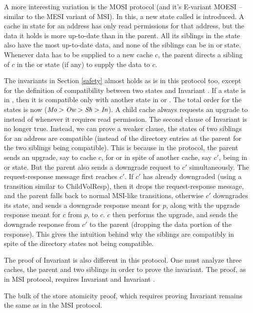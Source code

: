 A more interesting variation is the MOSI protocol (and it's E-variant MOESI --
similar to the MESI variant of MSI). In this, a new state called \Ow{} is
introduced. A cache in \Ow{} state for an address has only read permissions for
that address, but the data it holds is more up-to-date than in the parent.
All its siblings in the \Sh{} state also have the most up-to-date data, and
none of the siblings can be in \Mo{} or \Ow{} state.
Whenever data has to be supplied to a new cache $c$, the parent directs a
sibling of $c$ in the \Ow{} or \Mo{} state (if any) to supply the data to $c$.

The invariants in Section \ref{safety} almost holds as is in this protocol too,
except for the definition of compatibility between two states and Invariant
. If a state is in \Ow{}, then it is compatible only
with another state in \Sh{} or \In{}. The total order for the states is now
($\textit{Mo} > \textit{Ow} > \textit{Sh} > \textit{In}$). A child cache always requests an upgrade to \Ow{}
instead of \Sh{} whenever it requires read permission. The second clause of
Invariant  is no longer true. Instead, we can prove
a weaker clause, \viz the states of two siblings for an address are compatible
(instead of the directory entries at the parent for the two siblings being
compatible).  This is because in the protocol, the parent sends an upgrade, say
to cache $c$, for \Ow{} or \Mo{} in spite of another cache, say $c'$, being in
\Ow{} or \Mo{} state. But the parent also sends a downgrade request to $c'$
simultaneously. The request-response message first reaches $c'$. If $c'$ has
already downgraded (using a transition similar to ChildVolResp), then it drops
the request-response message, and the parent falls back to normal MSI-like
transitions, otherwise $c'$ downgrades its state, and sends a downgrade
response meant for $p$, along with the upgrade response meant for $c$ from $p$, to $c$.
$c$ then performs the upgrade, and sends the downgrade response from $c'$ to
the parent (dropping the data portion of the response). This gives the
intuition behind why the siblings are compatibly in spite of the directory
states not being compatible.

The proof of Invariant  is also different in this
protocol. One must analyze three caches, the parent and two siblings in order
to prove the invariant. The proof, as in MSI protocol, requires Invariant
 and Invariant .

The bulk of the store atomicity proof, which requires proving Invariant
 remains the same as in the MSI protocol.
